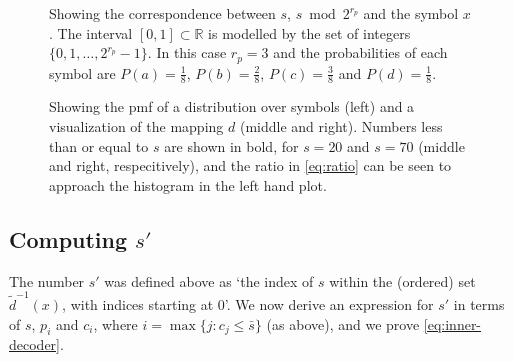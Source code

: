 \documentclass{article}
\begin{document}
\begin{figure}[ht]
  \centering
  \drawinterval
  \caption{
    Showing the correspondence between \(s\), \(s \bmod 2^{r_p}\) and the
    symbol \(x\). The interval \([0, 1]\subset\mathbb{R}\) is modelled by the
    set of integers \(\{0, 1, \ldots, 2^{r_p} - 1\}\). In this case \(r_p = 3\)
    and the probabilities of each symbol are \(P(a) = \frac{1}{8}\), \(P(b) =
    \frac{2}{8}\), \(P(c) = \frac{3}{8}\) and \(P(d) = \frac{1}{8}\).}
  \label{fig:interval}
\end{figure}

\begin{figure}[ht]
  \centering
  \drawpmf \quad {} \quad {}
  \caption{
    Showing the pmf of a distribution over symbols (left) and a visualization
    of the mapping \(d\) (middle and right).  Numbers less than or equal to
    \(s\) are shown in bold, for \(s=20\) and \(s=70\) (middle and right,
    respecitively), and the ratio in \cref{eq:ratio} can be seen to approach
    the histogram in the left hand plot.
  }\label{fig:visual-ans}
\end{figure}

\subsection{Computing \(s'\)}
The number \(s'\) was defined above as `the index of \(s\) within the (ordered)
set \(\tilde d^{-1}(x)\), with indices starting at \(0\)'. We now derive an
expression for \(s'\) in terms of \(s\), \(p_i\) and \(c_i\), where \(i =
\max\{j: c_j \leq \bar s\}\) (as above), and we prove \cref{eq:inner-decoder}.
\end{document}
